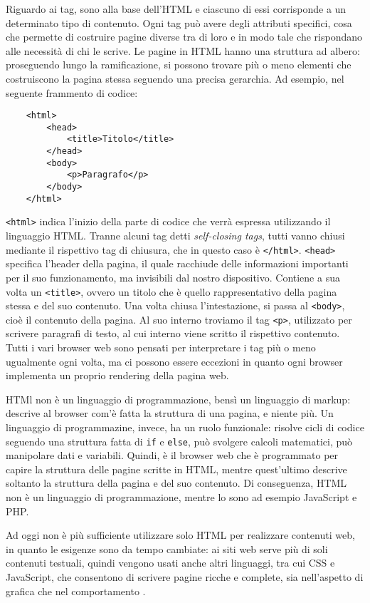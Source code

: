 Riguardo ai tag, sono alla base dell'HTML e ciascuno di essi corrisponde a un determinato tipo di contenuto. Ogni tag può avere degli attributi specifici, cosa che permette di costruire pagine diverse tra di loro e in modo tale che rispondano alle necessità di chi le scrive. Le pagine in HTML hanno una struttura ad albero: proseguendo lungo la ramificazione, si possono trovare più o meno elementi che costruiscono la pagina stessa seguendo una precisa gerarchia. Ad esempio, nel seguente frammento di codice:
\begin{verbatim}
    <html>
        <head>
            <title>Titolo</title>
        </head>
        <body>
            <p>Paragrafo</p>
        </body>
    </html>
\end{verbatim}
\Verb_<html>_ indica l'inizio della parte di codice che verrà espressa utilizzando il linguaggio HTML. Tranne alcuni tag detti \textit{self-closing tags}, tutti vanno chiusi mediante il rispettivo tag di chiusura, che in questo caso è \Verb_</html>_.
\Verb_<head>_ specifica l'header della pagina, il quale racchiude delle informazioni importanti per il suo funzionamento, ma invisibili dal nostro dispositivo. Contiene a sua volta un \Verb_<title>_, ovvero un titolo che è quello rappresentativo della pagina stessa e del suo contenuto. Una volta chiusa l'intestazione, si passa al \Verb_<body>_, cioè il contenuto della pagina. Al suo interno troviamo il tag \Verb_<p>_, utilizzato per scrivere paragrafi di testo, al cui interno viene scritto il rispettivo contenuto. Tutti i vari browser web sono pensati per interpretare i tag più o meno ugualmente ogni volta, ma ci possono essere eccezioni in quanto ogni browser implementa un proprio rendering della pagina web.

HTMl non è un linguaggio di programmazione, bensì un linguaggio di markup: descrive al browser com'è fatta la struttura di una pagina, e niente più. Un linguaggio di programmazine, invece, ha un ruolo funzionale: risolve cicli di codice seguendo una struttura fatta di \Verb_if_ e \Verb_else_, può svolgere calcoli matematici, può manipolare dati e variabili. Quindi, è il browser web che è programmato per capire la struttura delle pagine scritte in HTML, mentre quest'ultimo descrive soltanto la struttura della pagina e del suo contenuto. Di conseguenza, HTML non è un linguaggio di programmazione, mentre lo sono ad esempio JavaScript e PHP.

Ad oggi non è più sufficiente utilizzare solo HTML per realizzare contenuti web, in quanto le esigenze sono da tempo cambiate: ai siti web serve più di soli contenuti testuali, quindi vengono usati anche altri linguaggi, tra cui CSS e JavaScript, che consentono di scrivere pagine ricche e complete, sia nell'aspetto di grafica che nel comportamento \cite{HTML}.

